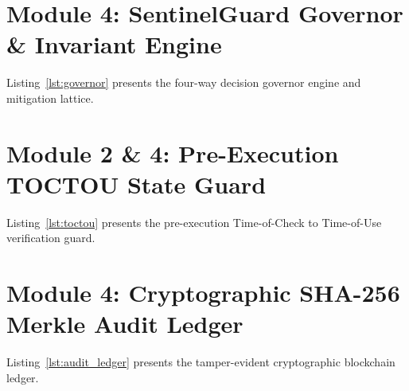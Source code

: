\documentclass[12pt,a4paper]{report}
\begin{document}
\section{Module 4: SentinelGuard Governor \& Invariant Engine}
Listing~\ref{lst:governor} presents the four-way decision governor engine and mitigation lattice.


\section{Module 2 \& 4: Pre-Execution TOCTOU State Guard}
Listing~\ref{lst:toctou} presents the pre-execution Time-of-Check to Time-of-Use verification guard.


\section{Module 4: Cryptographic SHA-256 Merkle Audit Ledger}
Listing~\ref{lst:audit_ledger} presents the tamper-evident cryptographic blockchain ledger.

\end{document}
